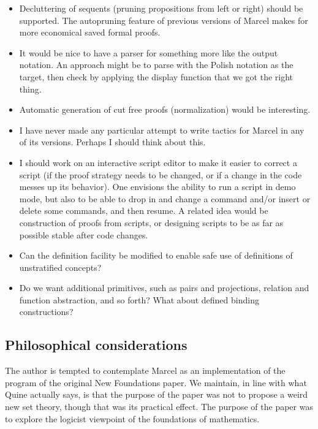 \documentclass{article}
\begin{document}
 \begin{itemize}
 
 \item Decluttering of sequents (pruning propositions from left or right) should be supported.  The autopruning feature
 of previous versions of Marcel makes for more economical saved formal proofs.
 
 \item  It would be nice to have a parser for something more like the output notation.  An approach might be to parse with the Polish notation as the target, then check by applying the display function that we got the right thing.
 
 \item  Automatic generation of cut free proofs (normalization) would be interesting.
 
 \item  I have never made any particular attempt to write tactics for Marcel in any of its versions.  Perhaps I should think about this.
 
 \item  I should work on an interactive script editor to make it easier to correct a script (if the proof strategy needs to be changed, or if a change in the code messes up its behavior).  One envisions the ability to run a script in demo mode, but
 also to be able to drop in and change a command and/or insert or delete some commands, and then resume.  A related idea would be construction of proofs from scripts, or designing scripts to be as far as possible stable after code changes.
 
 \item Can the definition facility be modified to enable safe use of definitions of unstratified concepts?
 
 \item  Do we want additional primitives, such as pairs and projections, relation and function abstraction, and so forth?  What about defined binding constructions?
 
 \end{itemize}
 
 \subsection{Philosophical considerations}
 
 The author is tempted to contemplate Marcel as an implementation of the program of the original New Foundations paper.   We maintain, in line with what Quine actually says, is that the purpose of the paper was not to propose a weird new set theory, though that was its practical effect.  The purpose of the paper was to explore the logicist viewpoint of the foundations of mathematics.
 
\end{document}
